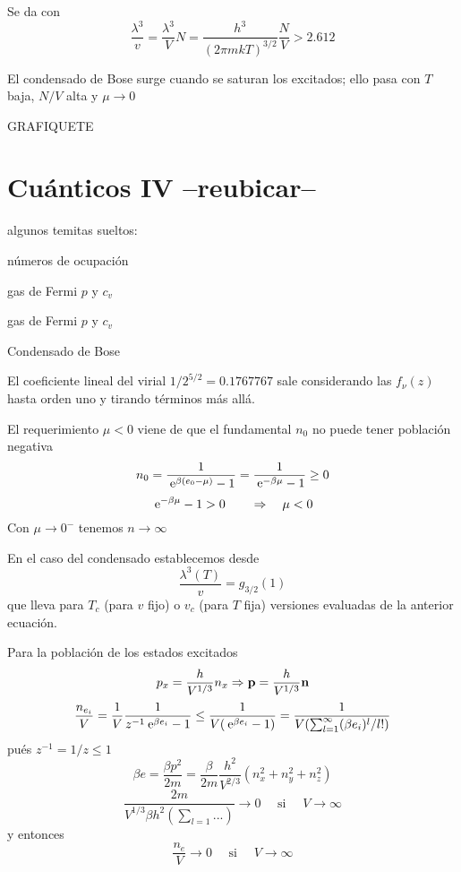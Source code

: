 \documentclass[10pt,oneside]{CBFT_book}
\begin{document}
Se da con 
\[
	\frac{\lambda^3}{v} = \frac{\lambda^3}{V} N = \frac{h^3}{(2\pi m kT)^{3/2}} \frac{N}{V} > 2.612
\]

El condensado de Bose surge cuando se saturan los excitados; ello pasa con $T$ baja, $N/V$
alta y $ \mu \to 0$

GRAFIQUETE

\section{Cuánticos IV --reubicar--}

algunos temitas sueltos:

números de ocupación

gas de Fermi $p$ y $c_v$

gas de Fermi $p$ y $c_v$

Condensado de Bose


El coeficiente lineal del virial $ 1/ 2^{5/2} = 0.1767767 $ sale considerando las $ f_{\nu}(z) $ hasta orden
uno y tirando términos más allá.


El requerimiento $ \mu < 0 $ viene de que el fundamental $ n_0 $ no puede tener población negativa
\[
	n_0 = \frac{1}{\:\mathrm{e}^{\beta(e_0 - \mu)} -1} = \frac{1}{\:\mathrm{e}^{-\beta\mu} -1} \geq 0
\]
\[
	\:\mathrm{e}^{-\beta\mu} -1 > 0 \qquad \Rightarrow \quad \mu < 0
\]
Con $\mu \to 0^-$ tenemos $ n \to \infty $

En el caso del condensado establecemos desde 
\[
	\frac{\lambda^3(T)}{v} = g_{3/2}(1) 
\]
que lleva para $T_c$ (para $v$ fijo) o $v_c$ (para $T$ fija) versiones evaluadas de la anterior ecuación.

Para la población de los estados excitados
\[
	p_x = \frac{h}{V^{1/3}}n_x \Rightarrow  \vb{p} = \frac{h}{V^{1/3}} \vb{n}
\]
\[
	\frac{n_{e_i}}{V} = \frac{1}{V} \frac{1}{ z^{-1}\:\mathrm{e}^{\beta e_i} - 1 } \leq 
	\frac{1}{V(\:\mathrm{e}^{\beta e_i} - 1)} = \frac{1}{V(\sum_{l=1}^\infty (\beta e_i )^l/l!)}
\]
pués $z^{-1} = 1/z \leq 1$
\[
	\beta e = \frac{\beta p^2}{2m} = \frac{\beta}{2m} \frac{h^2}{V^{2/3}} ( n_x^2 + n_y^2 + n_z^2)
\]
\[
	\frac{2m}{V^{1/3} \beta h^2 (\sum_{l=1} ... )} \to 0 \quad \text{ si } \quad V \to \infty
\]
y entonces
\[
	\frac{n_e}{V} \to 0 \quad \text{ si } \quad V \to \infty
\]
\end{document}
